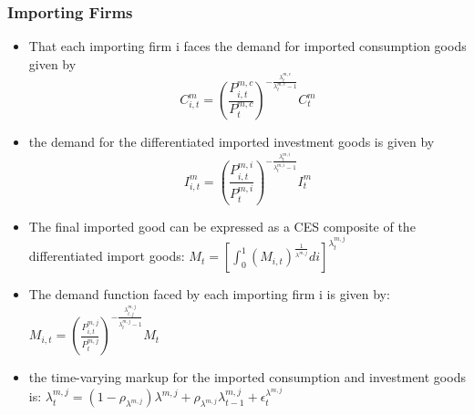 \documentclass[9pt]{beamer}
\begin{document}
\begin{frame}[noframenumbering]
\frametitle{Importing Firms}
\begin{itemize}

    \item That each importing firm i faces the demand for imported consumption goods given by
    $$
    C_{i, t}^{m}=\left(\frac{P_{i, t}^{m, c}}{P_{t}^{m, c}}\right)^{-\frac{\lambda_{t}^{m, c}}{\lambda_{t}^{m, c}-1}} C_{t}^{m}
    $$
    
    \item the demand for the differentiated imported investment goods is given by
    $$
    I_{i, t}^{m}=\left(\frac{P_{i, t}^{m, i}}{P_{t}^{m, i}}\right)^{-\frac{\lambda_{t}^{m, i}}{\lambda_{t}^{m, i}-1}} I_{t}^{m}
    $$
    
    \item The final imported good can be expressed as a CES composite of the differentiated import goods: $M_{t}=\left[\int_{0}^{1}\left(M_{i, t}\right)^{\frac{1}{\lambda^{m, j}}} d i\right]^{\lambda_{t}^{m, j}}$
        
    \item The demand function faced by each importing firm i is given by: $M_{i, t}=\left(\frac{P_{i, t}^{m, j}}{P_{t}^{m, j}}\right)^{-\frac{\lambda_{t, j}^{m, j}}{\lambda_{t}^{m, j}-1}} M_{t}$ 
        
    \item  the time-varying markup for the imported consumption and investment goods is: $\lambda_{t}^{m, j}=\left(1-\rho_{\lambda^{m, j}}\right) \lambda^{m, j}+\rho_{\lambda^{m, j}} \lambda_{t-1}^{m, j}+\epsilon_{t}^{\lambda^{m, j}}$
        
        

    
    

\end{itemize}

\end{frame}
\end{document}
